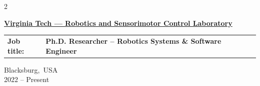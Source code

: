\documentclass[10pt, letterpaper]{article}
\newenvironment{highlights}{
    \begin{itemize}[
        topsep=0.10 cm,
        parsep=0.10 cm,
        partopsep=0pt,
        itemsep=0pt,
        leftmargin=0.2 cm + 10pt
    ]
}{
    \end{itemize}
} %
\newenvironment{twocolentry}[2][]{
    \onecolentry
    \def\secondColumn{#2}
    \setcolumnwidth{\fill, 2.8 cm}
    \begin{paracol}{2}
}{
    \switchcolumn \raggedleft \secondColumn
    \end{paracol}
    \endonecolentry
} %
\let\hrefWithoutArrow\href
\renewcommand{\href}[2]{\hrefWithoutArrow{#1}{#2}}
\begin{document}
        \begin{twocolentry}{
            Blacksburg,~USA\\
        2022 – Present
        }
            \textbf{{\href{http://nettagurari.com/}{\color{black}\Large{Virginia Tech --- Robotics and Sensorimotor Control Laboratory}}}}\\
\vspace{-.8em}

            \begin{tabular}{ l l l }
             \textbf{Job title:} &  \textbf{Ph.D. Researcher – Robotics Systems \& Software Engineer}\\  
            \end{tabular}

            \begin{highlights}


\end{highlights}
\end{twocolentry}
\end{document}
